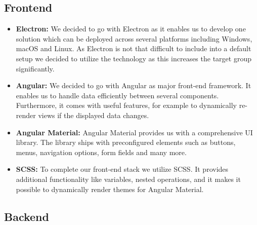 \subsection{Frontend}\label{subsec:frontend}

\begin{itemize}
    \item \textbf{Electron:} We decided to go with Electron as it enables us to develop one solution which can be
        deployed across several platforms including Windows, macOS and Linux. As Electron is not that difficult to
        include into a default setup we decided to utilize the technology as this increases the target group
        significantly.
    \item \textbf{Angular:} We decided to go with Angular as major front-end framework. It enables us to handle data
        efficiently between several components. Furthermore, it comes with useful features, for example to dynamically
        re-render views if the displayed data changes.
    \item \textbf{Angular Material:} Angular Material provides us with a comprehensive UI library. The library ships
        with preconfigured elements such as buttons, menus, navigation options, form fields and many more.
    \item \textbf{SCSS:} To complete our front-end stack we utilize SCSS. It provides additional functionality like
        variables, nested operations, and it makes it possible to dynamically render themes for Angular Material.
\end{itemize}

\subsection{Backend}\label{subsec:backend}

